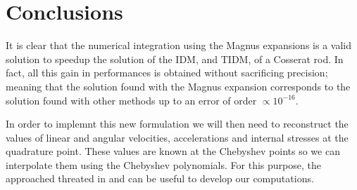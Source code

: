 \documentclass[12pt,a4paper]{article}
\begin{document}
\section{Conclusions}

It is clear that the numerical integration using the Magnus expansions is a valid solution to speedup the solution of the IDM, and TIDM, of a Cosserat rod. In fact, all this gain in performances is obtained without sacrificing precision; meaning that the solution found with the Magnus expansion corresponds to the solution found with other methods up to an error of order $\propto 10^{-16}$.


In order to implemnt this new formulation we will then need to reconstruct the values of linear and angular velocities, accelerations and internal stresses at the quadrature point. These values are known at the Chebyshev points so we can interpolate them using the Chebyshev polynomials. For this purpose, the approached threated in \cite{ahmed1974discrete} \cite{neagoe1990chebyshev} and \cite{Orekhov2020} can be useful to develop our computations.


\end{document}
